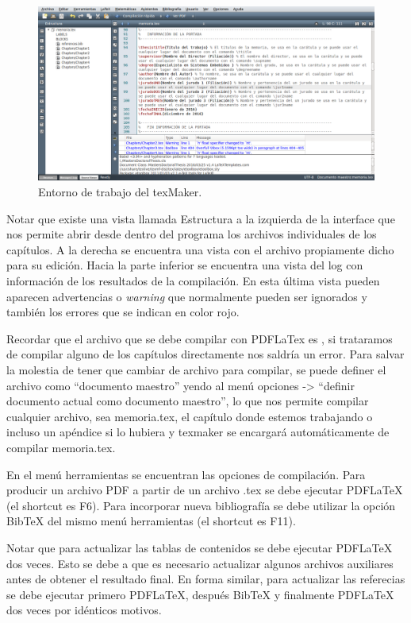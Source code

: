 \begin{figure}[h]
	\centering
	\includegraphics[width=\textwidth]{./Figures/texmaker.png}
	\caption{Entorno de trabajo del texMaker.}
	\label{fig:texmaker}
\end{figure}

Notar que existe una vista llamada Estructura a la izquierda de la interface que nos permite abrir desde dentro del programa los archivos individuales de los capítulos.  A la derecha se encuentra una vista con el archivo propiamente dicho para su edición. Hacia la parte inferior se encuentra una vista del log con información de los resultados de la compilación.  En esta última vista pueden aparecen advertencias o \textit{warning} que normalmente pueden ser ignorados y también los errores que se indican en color rojo.

Recordar que el archivo que se debe compilar con PDFLaTex es , si trataramos de compilar alguno de los capítulos directamente nos saldría un error.  Para salvar la molestia de tener que cambiar de archivo para compilar, se puede definer el archivo  como ``documento maestro'' yendo al menú opciones -> ``definir documento actual como documento maestro'', lo que nos permite compilar cualquier archivo, sea memoria.tex, el capítulo donde estemos trabajando o incluso un apéndice si lo hubiera y texmaker se encargará automáticamente de compilar memoria.tex.

En el menú herramientas se encuentran las opciones de compilación.  Para producir un archivo PDF a partir de un archivo .tex se debe ejecutar PDFLaTeX (el shortcut es F6). Para incorporar nueva bibliografía se debe utilizar la opción BibTeX del mismo menú herramientas (el shortcut es F11).

Notar que para actualizar las tablas de contenidos se debe ejecutar PDFLaTeX dos veces.  Esto se debe a que es necesario actualizar algunos archivos auxiliares antes de obtener el resultado final.  En forma similar, para actualizar las referecias se debe ejecutar primero PDFLaTeX, después BibTeX y finalmente PDFLaTeX dos veces por idénticos motivos.

